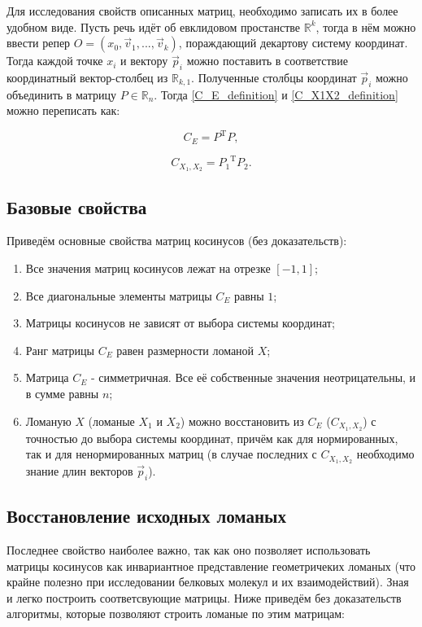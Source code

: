 Для исследования свойств описанных матриц, необходимо записать их в более удобном виде. Пусть речь идёт об евклидовом простанстве $\mathbb{R}^{k}$, тогда в нём можно ввести репер $O = (x_0, \vec{v}_1, ..., \vec{v}_k)$, пораждающий декартову систему координат. Тогда каждой точке $x_i$ и вектору $\vec{p}_i$ можно поставить в соответствие координатный вектор-столбец из $\mathbb{R}_{k,1}$. Полученные столбцы координат $\vec{p}_i$ можно объединить в матрицу $P \in \mathbb{R}_{n}$. Тогда \ref{C_E_definition} и \ref{C_X1X2_definition} можно переписать как:

\begin{equation}
	C_E = P^\mathrm{T}P,
	\label{C_E_calc}
\end{equation}

\begin{equation}
	C_{X_1, X_2} = {P_1}^\mathrm{T}{P_2}.
	\label{C_X1X2_calc}
\end{equation}

\subsection{Базовые свойства}

Приведём основные свойства матриц косинусов (без доказательств):
\begin{enumerate}
\item Все значения матриц косинусов лежат на отрезке $[-1, 1]$;
\item Все диагональные элементы матрицы $C_E$ равны $1$;
\item Матрицы косинусов не зависят от выбора системы координат;
\item Ранг матрицы $C_E$ равен размерности ломаной $X$;
\item Матрица $C_E$ - симметричная. Все её собственные значения неотрицательны, и в сумме равны $n$;
\item Ломаную $X$ (ломаные $X_1$ и $X_2$) можно восстановить из $C_E$ ($C_{X_1, X_2}$) с точностью до выбора системы координат, причём как для нормированных, так и для ненормированных матриц (в случае последних с $C_{X_1, X_2}$ необходимо знание длин векторов $\vec{p}_i$).
\end{enumerate}

\subsection{Восстановление исходных ломаных}

Последнее свойство наиболее важно, так как оно позволяет использовать матрицы косинусов как инвариантное представление геометричеких ломаных (что крайне полезно при исследовании белковых молекул и их взаимодействий). Зная \label{C_E_calc} и \label{C_X1X2_calc} легко построить соответсвующие матрицы. Ниже приведём без доказательств алгоритмы, которые позволяют строить ломаные по этим матрицам:

